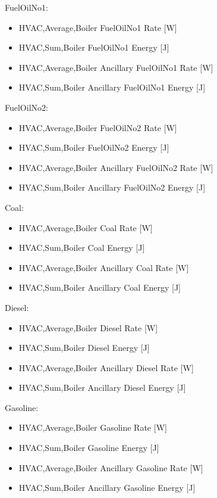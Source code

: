FuelOilNo1:

\begin{itemize}
    \item
    HVAC,Average,Boiler FuelOilNo1 Rate {[}W{]}
    \item
    HVAC,Sum,Boiler FuelOilNo1 Energy {[}J{]}
    \item
    HVAC,Average,Boiler Ancillary FuelOilNo1 Rate {[}W{]}
    \item
    HVAC,Sum,Boiler Ancillary FuelOilNo1 Energy {[}J{]}
\end{itemize}

FuelOilNo2:

\begin{itemize}
    \item
    HVAC,Average,Boiler FuelOilNo2 Rate {[}W{]}
    \item
    HVAC,Sum,Boiler FuelOilNo2 Energy {[}J{]}
    \item
    HVAC,Average,Boiler Ancillary FuelOilNo2 Rate {[}W{]}
    \item
    HVAC,Sum,Boiler Ancillary FuelOilNo2 Energy {[}J{]}
\end{itemize}

Coal:

\begin{itemize}
    \item
    HVAC,Average,Boiler Coal Rate {[}W{]}
    \item
    HVAC,Sum,Boiler Coal Energy {[}J{]}
    \item
    HVAC,Average,Boiler Ancillary Coal Rate {[}W{]}
    \item
    HVAC,Sum,Boiler Ancillary Coal Energy {[}J{]}
\end{itemize}

Diesel:

\begin{itemize}
    \item
    HVAC,Average,Boiler Diesel Rate {[}W{]}
    \item
    HVAC,Sum,Boiler Diesel Energy {[}J{]}
    \item
    HVAC,Average,Boiler Ancillary Diesel Rate {[}W{]}
    \item
    HVAC,Sum,Boiler Ancillary Diesel Energy {[}J{]}
\end{itemize}

Gasoline:

\begin{itemize}
    \item
    HVAC,Average,Boiler Gasoline Rate {[}W{]}
    \item
    HVAC,Sum,Boiler Gasoline Energy {[}J{]}
    \item
    HVAC,Average,Boiler Ancillary Gasoline Rate {[}W{]}
    \item
    HVAC,Sum,Boiler Ancillary Gasoline Energy {[}J{]}
\end{itemize}

